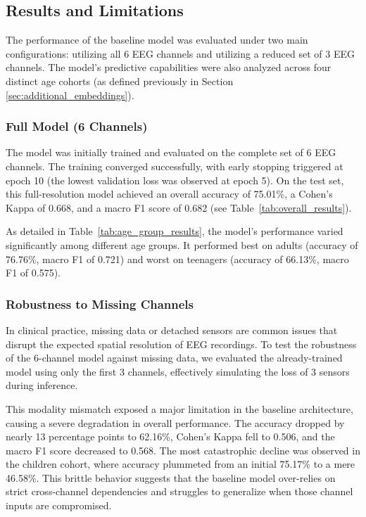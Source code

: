 \subsection{Results and Limitations}
The performance of the baseline model was evaluated under two main configurations: utilizing all 6 EEG channels and utilizing a reduced set of 3 EEG channels. The model's predictive capabilities were also analyzed across four distinct age cohorts (as defined previously in Section \ref{sec:additional_embeddings}).

\subsubsection*{Full Model (6 Channels)}
The model was initially trained and evaluated on the complete set of 6 EEG channels. The training converged successfully, with early stopping triggered at epoch 10 (the lowest validation loss was observed at epoch 5). On the test set, this full-resolution model achieved an overall accuracy of 75.01\%, a Cohen's Kappa of 0.668, and a macro F1 score of 0.682 (see Table~\ref{tab:overall_results}). 

As detailed in Table~\ref{tab:age_group_results}, the model's performance varied significantly among different age groups. It performed best on adults (accuracy of 76.76\%, macro F1 of 0.721) and worst on teenagers (accuracy of 66.13\%, macro F1 of 0.575).

\subsubsection*{Robustness to Missing Channels}
In clinical practice, missing data or detached sensors are common issues that disrupt the expected spatial resolution of EEG recordings. To test the robustness of the 6-channel model against missing data, we evaluated the already-trained model using only the first 3 channels, effectively simulating the loss of 3 sensors during inference. 

This modality mismatch exposed a major limitation in the baseline architecture, causing a severe degradation in overall performance. The accuracy dropped by nearly 13 percentage points to 62.16\%, Cohen's Kappa fell to 0.506, and the macro F1 score decreased to 0.568. The most catastrophic decline was observed in the children cohort, where accuracy plummeted from an initial 75.17\% to a mere 46.58\%. This brittle behavior suggests that the baseline model over-relies on strict cross-channel dependencies and struggles to generalize when those channel inputs are compromised.

